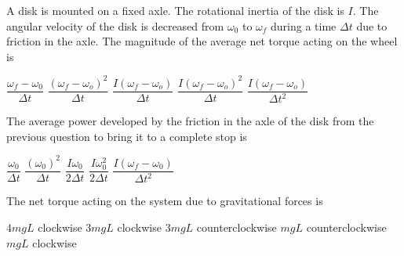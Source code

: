 \documentclass{../../../oss-ap12ibhl-print}
\begin{document}
\begin{questions}
  \question A disk is mounted on a fixed axle. The rotational inertia of the
  disk is $I$. The angular velocity of the disk is decreased from $\omega_0$ to
  $\omega_f$ during a time $\Delta t$ due to friction in the axle. The
  magnitude of the average net torque acting on the wheel is
  \begin{choices}
    \choice $\dfrac{\omega_f-\omega_0}{\Delta t}$
    \choice $\dfrac{(\omega_f-\omega_o)^2}{\Delta t}$
    \choice $\dfrac{I(\omega_f-\omega_o)}{\Delta t}$
    \choice $\dfrac{I(\omega_f-\omega_o)^2}{\Delta t}$
    \choice $\dfrac{I(\omega_f-\omega_o)}{\Delta t^2}$
  \end{choices}
    
  \question The average power developed by the friction in the axle of the disk
  from the previous question to bring it to a complete stop is
  \begin{choices}
    \choice $\dfrac{\omega_0}{\Delta t}$
    \choice $\dfrac{(\omega_0)^2}{\Delta t}$
    \choice $\dfrac{I\omega_0}{2\Delta t}$
    \choice $\dfrac{I\omega_0^2}{2\Delta t}$
    \choice $\dfrac{I(\omega_f-\omega_0)}{\Delta t^2}$
  \end{choices}
  \newpage
  


  \question The net torque acting on the system due to gravitational forces is
  \label{lightrod1}
  \begin{choices}
    \choice $4mgL$ clockwise
    \choice $3mgL$ clockwise
    \choice $3mgL$ counterclockwise
    \choice $mgL$ counterclockwise
    \choice $mgL$ clockwise
  \end{choices}
    

\end{questions}
\end{document}
